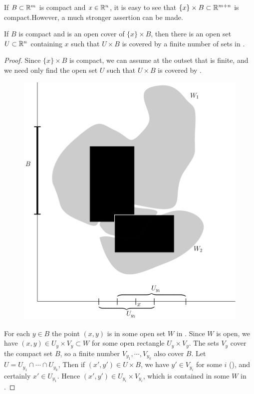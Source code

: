 If $B\subset \mathbb{R}^m$ is compact and $x \in \mathbb{R}^n$, it is easy to see that
$\{x\} \times B \subset \mathbb{R}^{m+n}$ is compact.However, a much stronger assertion can be made.
\begin{theorem}
    If $B$ is compact and  is an open cover of
    $\{x\} \times B$, then there is an open set $U \subset \mathbb{R}^n$ containing $x$ such
    that $U \times B$ is covered by a finite number of sets in .
\end{theorem}

\begin{proof}
    Since $\{x\} \times B$ is compact, we can assume at the
    outset that  is finite, and we need only find the open set $U$
    such that $U \times B$ is covered by .

    \begin{figure}[t]
        \centering
        \includegraphics[width=.75\linewidth]{./pics/Fig1-4.pdf}
        \caption{}
        \label{Fig 1-4}
    \end{figure}

    For each $y\in B$ the point $(x, y)$ is in some open set $W$ in .
    Since $W$ is open, we have $(x, y) \in U_y\times V_y\subset W$ for some 
    open rectangle $U_y\times V_y$. The sets $V_y$ cover the compact set $B$,
    so a finite  number $V_{y_1},\cdots, V_{y_k}$ also cover $B$. Let 
    $U = U_{y_1}\cap\cdots\cap U_{y_k}$, Then if $(x', y') \in U\times B$, 
    we have $y'\in V_{y_i}$ for some $i$ (), and certainly $x'\in U_{y_1}$.
    Hence $(x', y')\in U_{y_i}\times V_{y_i}$, which is contained in some $W$ in .
\end{proof}


